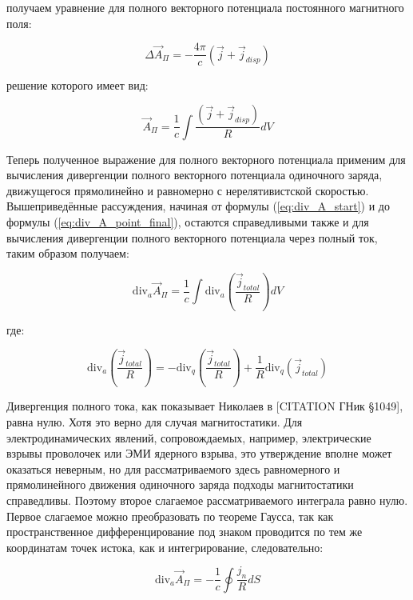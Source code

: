 \documentclass[12pt, a4paper]{article}
\begin{document}
получаем уравнение для полного векторного потенциала постоянного магнитного поля:

\begin{equation}
\Delta \vec{A}_{\Pi} = -\frac{4\pi}{c} (\vec{j} + \vec{j}_{disp})
\label{eq:poisson_A_full}
\end{equation}

решение которого имеет вид:

\begin{equation}
\vec{A}_{\Pi} = \frac{1}{c} \int \frac{(\vec{j} + \vec{j}_{disp})}{R} dV
\label{eq:A_solution_full}
\end{equation}

Теперь полученное выражение для полного векторного потенциала применим для вычисления дивергенции полного векторного потенциала одиночного заряда, движущегося прямолинейно и равномерно с нерелятивистской скоростью. Вышеприведённые рассуждения, начиная от формулы (\ref{eq:div_A_start}) и до формулы (\ref{eq:div_A_point_final}), остаются справедливыми также и для вычисления дивергенции полного векторного потенциала через полный ток, таким образом получаем:

\begin{equation}
\text{div}_a \vec{A}_{\Pi} = \frac{1}{c} \int \text{div}_a \left( \frac{\vec{j}_{total}}{R} \right) dV
\label{eq:div_A_total}
\end{equation}

где:

\begin{equation}
\text{div}_a \left( \frac{\vec{j}_{total}}{R} \right) = -\text{div}_q \left( \frac{\vec{j}_{total}}{R} \right) + \frac{1}{R} \text{div}_q(\vec{j}_{total})
\label{eq:div_total_identity}
\end{equation}

Дивергенция полного тока, как показывает Николаев в [CITATION ГНик §1049], равна нулю. Хотя это верно для случая магнитостатики. Для электродинамических явлений, сопровождаемых, например, электрические взрывы проволочек или ЭМИ ядерного взрыва, это утверждение вполне может оказаться неверным, но для рассматриваемого здесь равномерного и прямолинейного движения одиночного заряда подходы магнитостатики справедливы. Поэтому второе слагаемое рассматриваемого интеграла равно нулю. Первое слагаемое можно преобразовать по теореме Гаусса, так как пространственное дифференцирование под знаком проводится по тем же координатам точек истока, как и интегрирование, следовательно:

\begin{equation}
\text{div}_a \vec{A}_{\Pi} = -\frac{1}{c} \oint \frac{j_n}{R} dS
\label{eq:div_A_total_gauss}
\end{equation}
\end{document}
